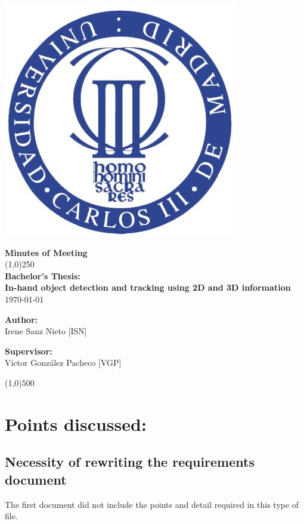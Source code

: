 \documentclass{article}
\newenvironment{myindentpar}[1]%
 {\begin{list}{}%
         {\setlength{\leftmargin}{#1}}%
         \item[]%
 }
 {\end{list}}
\begin{document}
\includegraphics[width=0.1\linewidth]{../template/uc3m.jpg}

\vspace{-1cm}
\begin{minipage}[b]{1\linewidth}
	\begin{center}
	{\Huge \bfseries{Minutes of Meeting}}\\
	\line(1,0){250}\\[0.5cm]
	{\LARGE \textbf{Bachelor's Thesis:\\[0.5cm] In-hand object detection and tracking using 2D and 3D information}}\\[0.5cm]
	{\large \today}
	\end{center}
\end {minipage}



\begin{minipage}{0.55\textwidth}
\begin{flushleft} \large
\textbf{{Author:}\\}
Irene Sanz Nieto [ISN]\\
\end{flushleft}
\end{minipage}
\begin{minipage}{0.4\textwidth}
\begin{flushright} \large
\textbf{Supervisor: }\\
Victor González Pacheco [VGP]
\end{flushright}\end{minipage}

\begin{center}
\line(1,0){500}
\end{center}

\renewcommand{\thesubsection}
{\hspace*{1cm} \arabic{section}.\arabic{subsection}}



\section{\LARGE Points discussed: }
	\subsection{Necessity of rewriting the requirements document}
		\begin{myindentpar}{1cm} 
		The first document did not include the points and detail required in this type of file. 
		\end{myindentpar}
\end{document}
